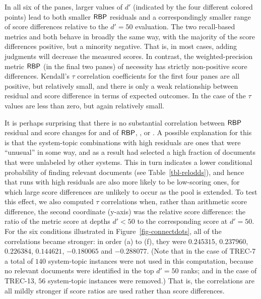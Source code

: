 In all six of the panes, larger values of $d'$ (indicated by the four
different colored points) lead to both smaller ${\mbox{\sf{RBP}}}$ residuals and a
correspondingly smaller range of score differences relative to the
$d'=50$ evaluation.
The two recall-based metrics {\ap} and {\ndcg} both behave in broadly
the same way, with the majority of the score differences positive,
but a minority negative.
That is, in most cases, adding judgments will decrease the measured
scores.
In contrast, the weighted-precision metric ${\mbox{\sf{RBP}}}$ (in the final two
panes) of necessity has strictly non-positive score differences.
Kendall's $\tau$ correlation coefficients for the first four panes
are all positive, but relatively small, and there is only a weak
relationship between residual and score difference in terms of
expected outcomes.
In the case of {\rbp} the $\tau$ values are less than zero, but again
relatively small.

It is perhaps surprising that there is no substantial correlation
between ${\mbox{\sf{RBP}}}$ residual and score changes for and of ${\mbox{\sf{RBP}}}$, {\ap},
or {\ndcg}.
A possible explanation for this is that the system-topic combinations
with high residuals are ones that were ``unusual'' in some way, and
as a result had selected a high fraction of documents that were
unlabeled by other systems.
This in turn indicates a lower conditional probability of finding
relevant documents (see Table~\ref{tbl-relodds}), and hence that runs
with high residuals are also more likely to be low-scoring ones, for
which large score differences are unlikely to occur as the pool is extended.
To test this effect, we also computed $\tau$ correlations when,
rather than arithmetic score difference, the second coordinate (y-axis) was
the relative score difference: the ratio of the metric score at
depths $d'<50$ to the corresponding score at $d'=50$.
For the six conditions illustrated in Figure~\ref{fig-connectdots},
all of the correlations became stronger: in order (a) to (f), they
were $\num{0.245315}$, $\num{0.237960}$, $\num{0.226384}$,
$\num{0.144621}$, $\num{-0.180065}$ and $\num{-0.288077}$.
(Note that in the case of TREC-7 a total of $140$ system-topic
instances were not used in this computation, because no relevant
documents were identified in the top $d'=50$ ranks; and in the case
of TREC-13, $56$ system-topic instances were removed.)
That is, the correlations are all mildly stronger if score ratios are
used rather than score differences.



